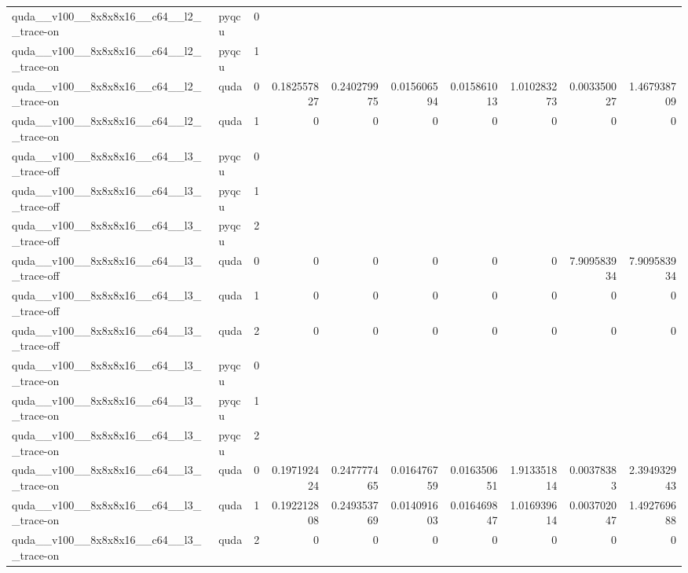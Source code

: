 \begin{table}[htbp]
\begin{tabular}{@{}llrrrrrrrr@{}}
quda\_\_v100\_\_8x8x8x16\_\_c64\_\_l2\_\_trace-on & pyqcu & 0 &  &  &  &  &  &  &  \\
quda\_\_v100\_\_8x8x8x16\_\_c64\_\_l2\_\_trace-on & pyqcu & 1 &  &  &  &  &  &  &  \\
quda\_\_v100\_\_8x8x8x16\_\_c64\_\_l2\_\_trace-on & quda & 0 & 0.182557827 & 0.240279975 & 0.015606594 & 0.015861013 & 1.010283273 & 0.003350027 & 1.467938709 \\
quda\_\_v100\_\_8x8x8x16\_\_c64\_\_l2\_\_trace-on & quda & 1 & 0 & 0 & 0 & 0 & 0 & 0 & 0 \\
quda\_\_v100\_\_8x8x8x16\_\_c64\_\_l3\_\_trace-off & pyqcu & 0 &  &  &  &  &  &  &  \\
quda\_\_v100\_\_8x8x8x16\_\_c64\_\_l3\_\_trace-off & pyqcu & 1 &  &  &  &  &  &  &  \\
quda\_\_v100\_\_8x8x8x16\_\_c64\_\_l3\_\_trace-off & pyqcu & 2 &  &  &  &  &  &  &  \\
quda\_\_v100\_\_8x8x8x16\_\_c64\_\_l3\_\_trace-off & quda & 0 & 0 & 0 & 0 & 0 & 0 & 7.909583934 & 7.909583934 \\
quda\_\_v100\_\_8x8x8x16\_\_c64\_\_l3\_\_trace-off & quda & 1 & 0 & 0 & 0 & 0 & 0 & 0 & 0 \\
quda\_\_v100\_\_8x8x8x16\_\_c64\_\_l3\_\_trace-off & quda & 2 & 0 & 0 & 0 & 0 & 0 & 0 & 0 \\
quda\_\_v100\_\_8x8x8x16\_\_c64\_\_l3\_\_trace-on & pyqcu & 0 &  &  &  &  &  &  &  \\
quda\_\_v100\_\_8x8x8x16\_\_c64\_\_l3\_\_trace-on & pyqcu & 1 &  &  &  &  &  &  &  \\
quda\_\_v100\_\_8x8x8x16\_\_c64\_\_l3\_\_trace-on & pyqcu & 2 &  &  &  &  &  &  &  \\
quda\_\_v100\_\_8x8x8x16\_\_c64\_\_l3\_\_trace-on & quda & 0 & 0.197192424 & 0.247777465 & 0.016476759 & 0.016350651 & 1.913351814 & 0.00378383 & 2.394932943 \\
quda\_\_v100\_\_8x8x8x16\_\_c64\_\_l3\_\_trace-on & quda & 1 & 0.192212808 & 0.249353769 & 0.014091603 & 0.016469847 & 1.016939614 & 0.003702047 & 1.492769688 \\
quda\_\_v100\_\_8x8x8x16\_\_c64\_\_l3\_\_trace-on & quda & 2 & 0 & 0 & 0 & 0 & 0 & 0 & 0 \\
\bottomrule
\end{tabular}
\end{table}


